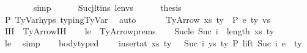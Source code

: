 \begin{isabellebody}
\ \ \ \ \ \ \isamarkupfalse%
\ simp\isanewline
\isanewline
\ \ \ \ \isamarkupfalse%
\ Sucj{\isacharunderscore}{\kern0pt}lt{\isacharunderscore}{\kern0pt}ins\ len{\isacharunderscore}{\kern0pt}vs\isanewline
\ \ \ \ \isamarkupfalse%
\ {\isacharquery}{\kern0pt}thesis\isanewline
\ \ \ \ \ \ \isamarkupfalse%
\ P{}\ TyVar{\isachardot}{\kern0pt}hyps{\isacharparenleft}{\kern0pt}{}{\isacharcomma}{\kern0pt}{}{\isacharcomma}{\kern0pt}{}{\isacharparenright}{\kern0pt}\ typing{\isachardot}{\kern0pt}TyVar\ \isamarkupfalse%
\ auto\isanewline
\ \ \isamarkupfalse%
\isanewline
\isanewline
{}\isamarkupfalse%
\isanewline
\ \ \isamarkupfalse%
\ {\isacharparenleft}{\kern0pt}TyArrow\ xs\ ty{}\ {\isasymGamma}\ P\ e\ ty{}{\isacharprime}{\kern0pt}\ vs{\isacharparenright}{\kern0pt}\isanewline
\ \ \isamarkupfalse%
\ IH\ {\isacharequal}{\kern0pt}\ TyArrow{\isachardot}{\kern0pt}IH\isanewline
\ \ \isamarkupfalse%
\ le\ {\isacharequal}{\kern0pt}\ TyArrow{\isachardot}{\kern0pt}prems\isanewline
\isanewline
\ \ \isamarkupfalse%
\ Suc{\isacharunderscore}{\kern0pt}le{\isacharcolon}{\kern0pt}\ {\isachardoublequoteopen}Suc\ i\ {\isasymle}\ length\ {\isacharparenleft}{\kern0pt}{\isacharparenleft}{\kern0pt}xs{\isacharcomma}{\kern0pt}\ ty{}{\isacharparenright}{\kern0pt}\ {\isacharhash}{\kern0pt}\ {\isasymGamma}{\isacharparenright}{\kern0pt}{\isachardoublequoteclose}\isanewline
\ \ \ \ \isamarkupfalse%
\ le\ \isamarkupfalse%
\ simp\isanewline
\isanewline
\ \ \isamarkupfalse%
\ body{\isacharunderscore}{\kern0pt}typed{\isacharcolon}{\kern0pt}\isanewline
\ \ \ \ {\isachardoublequoteopen}insert{\isacharunderscore}{\kern0pt}at\ {\isacharparenleft}{\kern0pt}{\isacharparenleft}{\kern0pt}xs{\isacharcomma}{\kern0pt}\ ty{}{\isacharparenright}{\kern0pt}\ {\isacharhash}{\kern0pt}\ {\isasymGamma}{\isacharparenright}{\kern0pt}\ {\isacharparenleft}{\kern0pt}Suc\ i{\isacharparenright}{\kern0pt}\ {\isacharparenleft}{\kern0pt}ys{\isacharcomma}{\kern0pt}\ ty{}{\isacharparenright}{\kern0pt}\ {\isasymturnstile}{\isacharbraceleft}{\kern0pt}P{\isacharbraceright}{\kern0pt}\ lift\ {\isacharparenleft}{\kern0pt}Suc\ i{\isacharparenright}{\kern0pt}\ e\ {\isacharcolon}{\kern0pt}\ ty{}{\isacharprime}{\kern0pt}{\isachardoublequoteclose}\isanewline

\end{isabellebody}
